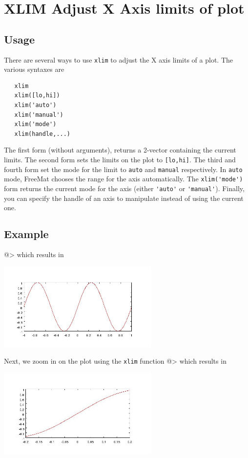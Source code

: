 \section{XLIM Adjust X Axis limits of plot}

\subsection{Usage}

There are several ways to use \verb|xlim| to adjust the X axis limits of
a plot.  The various syntaxes are
\begin{verbatim}
   xlim
   xlim([lo,hi])   
   xlim('auto')
   xlim('manual')
   xlim('mode')
   xlim(handle,...)
\end{verbatim}
The first form (without arguments), returns a 2-vector containing the
current limits.  The second form sets the limits on the plot to \verb|[lo,hi]|.
The third and fourth form set the mode for the limit to \verb|auto| and \verb|manual|
respectively.  In \verb|auto| mode, FreeMat chooses the range for the axis 
automatically.  The \verb|xlim('mode')| form returns the current mode for the axis
(either \verb|'auto'| or \verb|'manual'|).  Finally, you can specify the handle of an
axis to manipulate instead of using the current one.
\subsection{Example}

@>
which results in


\centerline{\includegraphics[width=8cm]{xlim1}}

Next, we zoom in on the plot using the \verb|xlim| function
@>
which results in


\centerline{\includegraphics[width=8cm]{xlim2}}

